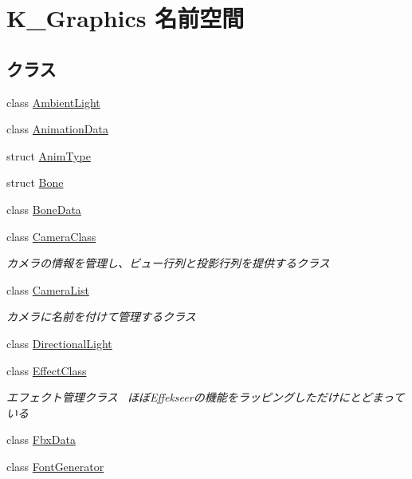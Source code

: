 \hypertarget{namespace_k___graphics}{}\section{K\+\_\+\+Graphics 名前空間}
\label{namespace_k___graphics}
\subsection*{クラス}
\begin{DoxyCompactItemize}
\item 
class \mbox{\hyperlink{class_k___graphics_1_1_ambient_light}{Ambient\+Light}}
\item 
class \mbox{\hyperlink{class_k___graphics_1_1_animation_data}{Animation\+Data}}
\item 
struct \mbox{\hyperlink{struct_k___graphics_1_1_anim_type}{Anim\+Type}}
\item 
struct \mbox{\hyperlink{struct_k___graphics_1_1_bone}{Bone}}
\item 
class \mbox{\hyperlink{class_k___graphics_1_1_bone_data}{Bone\+Data}}
\item 
class \mbox{\hyperlink{class_k___graphics_1_1_camera_class}{Camera\+Class}}
\begin{DoxyCompactList}\small\item\em カメラの情報を管理し、ビュー行列と投影行列を提供するクラス \end{DoxyCompactList}\item 
class \mbox{\hyperlink{class_k___graphics_1_1_camera_list}{Camera\+List}}
\begin{DoxyCompactList}\small\item\em カメラに名前を付けて管理するクラス \end{DoxyCompactList}\item 
class \mbox{\hyperlink{class_k___graphics_1_1_directional_light}{Directional\+Light}}
\item 
class \mbox{\hyperlink{class_k___graphics_1_1_effect_class}{Effect\+Class}}
\begin{DoxyCompactList}\small\item\em エフェクト管理クラス~\newline
ほぼ\+Effekseerの機能をラッピングしただけにとどまっている \end{DoxyCompactList}\item 
class \mbox{\hyperlink{class_k___graphics_1_1_fbx_data}{Fbx\+Data}}
\item 
class \mbox{\hyperlink{class_k___graphics_1_1_font_generator}{Font\+Generator}}

\end{DoxyCompactItemize}
